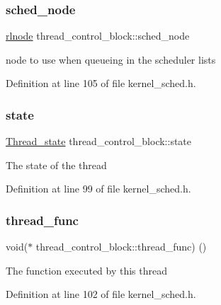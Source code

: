 \subsubsection{\texorpdfstring{sched\+\_\+node}{sched\_node}}
{\footnotesize\ttfamily \hyperlink{group__rlists_ga8f6244877f7ce2322c90525217ea6e7a}{rlnode} thread\+\_\+control\+\_\+block\+::sched\+\_\+node}

node to use when queueing in the scheduler lists 

Definition at line 105 of file kernel\+\_\+sched.\+h.

\mbox{\label{structthread__control__block_affd872365cf4768fa1c9bd1e196bb97c}} 
\subsubsection{\texorpdfstring{state}{state}}
{\footnotesize\ttfamily \hyperlink{group__scheduler_ga6c969c169777f82c104cf73e501df70f}{Thread\+\_\+state} thread\+\_\+control\+\_\+block\+::state}

The state of the thread 

Definition at line 99 of file kernel\+\_\+sched.\+h.

\mbox{\label{structthread__control__block_a91a73f2ad3f727b7412b912b3d65109a}} 
\subsubsection{\texorpdfstring{thread\+\_\+func}{thread\_func}}
{\footnotesize\ttfamily void($\ast$ thread\+\_\+control\+\_\+block\+::thread\+\_\+func) ()}

The function executed by this thread 

Definition at line 102 of file kernel\+\_\+sched.\+h.

\mbox{\label{structthread__control__block_abd0f40bdcb22c701df03f560bbc42d5c}} 
